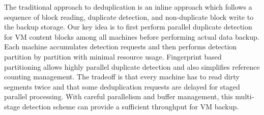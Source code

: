 The traditional approach to  deduplication is an inline approach which follows
a sequence of block reading, duplicate detection,  and non-duplicate  block write to the 
backup storage.  
Our key idea  is to  first perform parallel duplicate detection for VM content blocks 
among all machines before performing actual data backup. Each machine
accumulates detection requests and  then performs detection   partition by partition 
with minimal resource usage.
Fingerprint based partitioning allows highly parallel duplicate detection  and also simplifies 
reference counting management.  
The tradeoff is that every machine has to read dirty segments twice
and that some deduplication requests are delayed for staged parallel processing.
With careful parallelism and buffer  management,
this multi-stage detection scheme can provide  a sufficient throughput for VM backup.   












